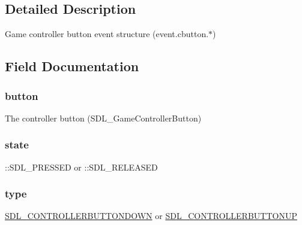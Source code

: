 \subsection{Detailed Description}
Game controller button event structure (event.\+cbutton.$\ast$) 

\subsection{Field Documentation}
\subsubsection[{\texorpdfstring{button}{button}}]{ button}\hypertarget{struct_s_d_l___controller_button_event_a63c1d3c03e676c0ea5864dc6d0b0082c}{}\label{struct_s_d_l___controller_button_event_a63c1d3c03e676c0ea5864dc6d0b0082c}
The controller button (S\+D\+L\+\_\+\+Game\+Controller\+Button) 
\subsubsection[{\texorpdfstring{state}{state}}]{ state}\hypertarget{struct_s_d_l___controller_button_event_a6b8d8e916bc56265a3fd279bd26b6d1b}{}\label{struct_s_d_l___controller_button_event_a6b8d8e916bc56265a3fd279bd26b6d1b}
\+::\+S\+D\+L\+\_\+\+P\+R\+E\+S\+S\+ED or \+::\+S\+D\+L\+\_\+\+R\+E\+L\+E\+A\+S\+ED 
\subsubsection[{\texorpdfstring{type}{type}}]{ type}\hypertarget{struct_s_d_l___controller_button_event_aa40a9b05c3154032b9f2d7220e9f08dc}{}\label{struct_s_d_l___controller_button_event_aa40a9b05c3154032b9f2d7220e9f08dc}
\hyperlink{_s_d_l__events_8h_a3b589e89be6b35c02e0dd34a55f3fccaaafe044d5f92ac9608ded473218569474}{S\+D\+L\+\_\+\+C\+O\+N\+T\+R\+O\+L\+L\+E\+R\+B\+U\+T\+T\+O\+N\+D\+O\+WN} or \hyperlink{_s_d_l__events_8h_a3b589e89be6b35c02e0dd34a55f3fccaa8cb5a10b1ae0e185ef69a321d3d2d1be}{S\+D\+L\+\_\+\+C\+O\+N\+T\+R\+O\+L\+L\+E\+R\+B\+U\+T\+T\+O\+N\+UP} 

